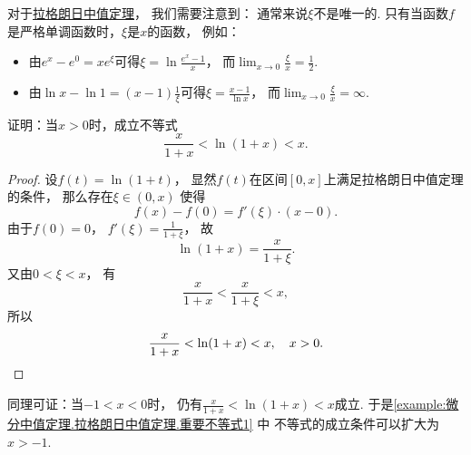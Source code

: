 \begin{remark}
对于\hyperref[theorem:微分中值定理.拉格朗日中值定理]{拉格朗日中值定理}，
我们需要注意到：
通常来说\(\xi\)不是唯一的.
只有当函数\(f\)是严格单调函数时，\(\xi\)是\(x\)的函数，
例如：\begin{itemize}
	\item 由\(e^x - e^0 = x e^\xi\)可得\(\xi = \ln\frac{e^x-1}{x}\)，
	而\(\lim_{x\to0} \frac{\xi}{x} = \frac12\).
	\item 由\(\ln x - \ln1 = (x-1) \frac1\xi\)可得\(\xi = \frac{x-1}{\ln x}\)，
	而\(\lim_{x\to0} \frac{\xi}{x} = \infty\).
\end{itemize}
\end{remark}

\begin{example}\label{example:微分中值定理.拉格朗日中值定理.重要不等式1}
证明：当\(x>0\)时，成立不等式\begin{equation*}
	\frac{x}{1+x} < \ln(1+x) < x.
\end{equation*}
\begin{proof}
设\(f(t) = \ln(1+t)\)，
显然\(f(t)\)在区间\([0,x]\)上满足拉格朗日中值定理的条件，
那么存在\(\xi\in(0,x)\)
使得\begin{equation*}
	f(x)-f(0)=f'(\xi)\cdot(x-0).
\end{equation*}
由于\(f(0)=0\)，
\(f'(\xi)=\frac1{1+\xi}\)，
故\begin{equation*}
	\ln(1+x) = \frac{x}{1+\xi}.
\end{equation*}
又由\(0<\xi<x\)，
有\begin{equation*}
	\frac{x}{1+x}<\frac{x}{1+\xi}<x,
\end{equation*}
所以\begin{equation*}
	\frac{x}{1+x}<\ln(1+x)<x, \quad x > 0.
	\qedhere
\end{equation*}
\end{proof}
\end{example}
\begin{remark}
同理可证：当\(-1<x<0\)时，
仍有\(\frac{x}{1+x}<\ln(1+x)<x\)成立.
于是\cref{example:微分中值定理.拉格朗日中值定理.重要不等式1} 中
不等式的成立条件可以扩大为\(x>-1\).
\end{remark}

